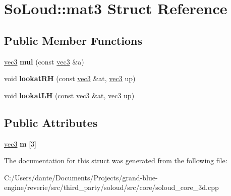 \hypertarget{struct_so_loud_1_1mat3}{}\section{So\+Loud\+::mat3 Struct Reference}
\label{struct_so_loud_1_1mat3}
\subsection*{Public Member Functions}
\begin{DoxyCompactItemize}
\item 
\mbox{\label{struct_so_loud_1_1mat3_ab2f0eb5c6ccba323f68867424c009ce4}} 
\mbox{\hyperlink{struct_so_loud_1_1vec3}{vec3}} {\bfseries mul} (const \mbox{\hyperlink{struct_so_loud_1_1vec3}{vec3}} \&a)
\item 
\mbox{\label{struct_so_loud_1_1mat3_a579b8e51bad158db3b6e5c407275bf21}} 
void {\bfseries lookat\+RH} (const \mbox{\hyperlink{struct_so_loud_1_1vec3}{vec3}} \&at, \mbox{\hyperlink{struct_so_loud_1_1vec3}{vec3}} up)
\item 
\mbox{\label{struct_so_loud_1_1mat3_a9ab1df18204bfdd6b1a13a079cdbb216}} 
void {\bfseries lookat\+LH} (const \mbox{\hyperlink{struct_so_loud_1_1vec3}{vec3}} \&at, \mbox{\hyperlink{struct_so_loud_1_1vec3}{vec3}} up)
\end{DoxyCompactItemize}
\subsection*{Public Attributes}
\begin{DoxyCompactItemize}
\item 
\mbox{\label{struct_so_loud_1_1mat3_a2b817c34a39df1ce513c7e89b75eb0ed}} 
\mbox{\hyperlink{struct_so_loud_1_1vec3}{vec3}} {\bfseries m} \mbox{[}3\mbox{]}
\end{DoxyCompactItemize}


The documentation for this struct was generated from the following file\+:\begin{DoxyCompactItemize}
\item 
C\+:/\+Users/dante/\+Documents/\+Projects/grand-\/blue-\/engine/reverie/src/third\+\_\+party/soloud/src/core/soloud\+\_\+core\+\_\+3d.\+cpp\end{DoxyCompactItemize}
